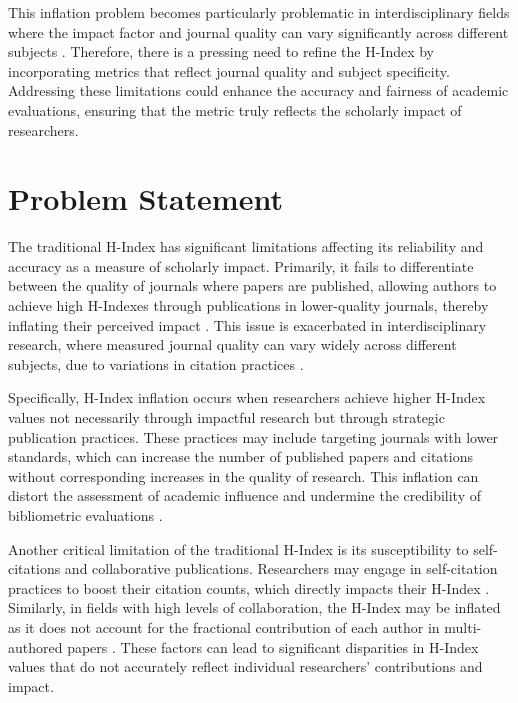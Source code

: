 This inflation problem becomes particularly problematic in interdisciplinary
fields where the impact factor and journal quality can vary significantly
across different subjects \cite{hirsch2005index,waltman2012inconsistency}.
Therefore, there is a pressing need to refine the H-Index by incorporating
metrics that reflect journal quality and subject specificity. Addressing these
limitations could enhance the accuracy and fairness of academic evaluations,
ensuring that the metric truly reflects the scholarly impact of researchers.

\section{Problem Statement}
The traditional H-Index has significant limitations affecting its reliability
and accuracy as a measure of scholarly impact. Primarily, it fails to
differentiate between the quality of journals where papers are published,
allowing authors to achieve high H-Indexes through publications in
lower-quality journals, thereby inflating their perceived impact
\cite{costas2007h,tonta2020monetary}. This issue is exacerbated in
interdisciplinary research, where measured journal quality can vary widely
across different subjects, due to variations in citation practices
\cite{costas2007h,norris2010h}.

Specifically, H-Index inflation occurs when researchers achieve higher H-Index
values not necessarily through impactful research but through strategic
publication practices. These practices may include targeting journals with
lower standards, which can increase the number of published papers and
citations without corresponding increases in the quality of research. This
inflation can distort the assessment of academic influence and undermine the
credibility of bibliometric evaluations \cite{tonta2020monetary}.

Another critical limitation of the traditional H-Index is its susceptibility to
self-citations and collaborative publications. Researchers may engage in
self-citation practices to boost their citation counts, which directly impacts
their H-Index
\cite{hirsch2005index,schreiber2008share,costas2007h,waltman2012inconsistency,norris2010h,bartneck2011detecting,zhivotovsky2008self}.
Similarly, in fields with high levels of collaboration, the H-Index may be
inflated as it does not account for the fractional contribution of each author
in multi-authored papers
\cite{schreiber2008share,costas2007h,waltman2012inconsistency,norris2010h,zhivotovsky2008self}.
These factors can lead to significant disparities in H-Index values that do not
accurately reflect individual researchers' contributions and impact.

